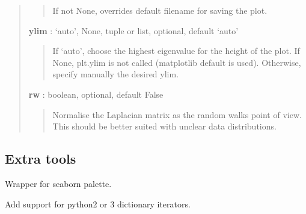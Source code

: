 \documentclass[letterpaper,10pt,english]{sphinxmanual}
\begin{document}
\begin{fulllineitems}
\begin{quote}
\begin{description}
\begin{quote}
If not None, overrides default filename for saving the plot.
\end{quote}

\textbf{ylim} : `auto', None, tuple or list, optional, default `auto'
\begin{quote}

If `auto', choose the highest eigenvalue for the height of the plot.
If None, plt.ylim is not called (matplotlib default is used).
Otherwise, specify manually the desired ylim.
\end{quote}

\textbf{rw} : boolean, optional, default False
\begin{quote}

Normalise the Laplacian matrix as the random walks point of view.
This should be better suited with unclear data distributions.
\end{quote}

\end{description}\end{quote}

\end{fulllineitems}



\subsection{Extra tools}
\label{index:extra-tools}\label{index:module-adenine.utils.extra}

\begin{fulllineitems}
\label{index:adenine.utils.extra.Palette}
Wrapper for seaborn palette.

\end{fulllineitems}


\begin{fulllineitems}
\label{index:adenine.utils.extra.values_iterator}
Add support for python2 or 3 dictionary iterators.

\end{fulllineitems}

\end{document}
